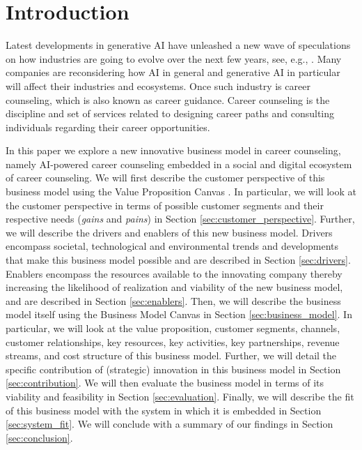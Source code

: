 \section{Introduction}
\label{sec:introduction}

Latest developments in generative AI have unleashed a new wave of speculations on how industries are going to
evolve over the next few years, see, e.g., \cite{chuiHowGenerativeAI2022}. Many companies are reconsidering how
AI in general and generative AI in particular will affect their industries and ecosystems. Once such industry is
career counseling, which is also known as career guidance. Career counseling is the discipline and set of services
related to designing career paths and consulting individuals regarding their career opportunities.

In this paper we explore a new innovative business model in career counseling, namely AI-powered career counseling
embedded in a social and digital ecosystem of career counseling. We will first describe the customer perspective of
this business model using the Value Proposition Canvas \citep{osterwalderValuePropositionDesign2014}. In particular,
we will look at  the customer perspective in terms of possible customer segments and their respective needs
(\textit{gains} and \textit{pains}) in Section \ref{sec:customer_perspective}. Further, we will describe the drivers
and enablers of this new business model. Drivers encompass societal, technological and environmental trends and
developments that make this business model possible and are described in Section \ref{sec:drivers}. Enablers encompass
the resources available to the innovating company thereby increasing the likelihood of realization and viability of the
new business model, and are described in Section \ref{sec:enablers}. Then, we will describe the business model itself
using the Business Model Canvas \citep{osterwalderBusinessModelGeneration2010} in Section \ref{sec:business_model}.
In particular, we will look at the value proposition, customer segments, channels, customer relationships, key
resources, key activities, key partnerships, revenue streams, and cost structure of this business model.
Further, we will detail the specific contribution of (strategic) innovation in this business model in Section
\ref{sec:contribution}. We will then evaluate the business model in terms of its viability and feasibility in Section
\ref{sec:evaluation}. Finally, we will describe the fit of this business model with the system in which it is embedded
in Section \ref{sec:system_fit}. We will conclude with a summary of our findings in Section \ref{sec:conclusion}.

